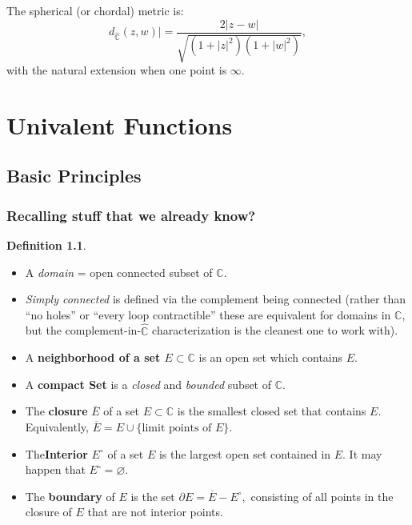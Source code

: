 \documentclass[
]{book}
\providecommand{\tightlist}{%
  \setlength{\itemsep}{0pt}\setlength{\parskip}{0pt}}
\theoremstyle{definition}
\newtheorem{definition}{Definition}[chapter]
\theoremstyle{definition}
\theoremstyle{definition}
\theoremstyle{definition}
\theoremstyle{remark}
\begin{document}
The spherical (or chordal) metric is:
\[
d_{\widehat{\mathbb{C}}}(z,w)|
= \frac{2|z-w|}{\sqrt{(1+|z|^2)(1+|w|^2)}},
\]
with the natural extension when one point is \(\infty\).

\chapter{Univalent Functions}\label{univalent-functions}

\section{Basic Principles}\label{basic-principles}

\subsection{Recalling stuff that we already know?}\label{recalling-stuff-that-we-already-know}

\begin{definition}
\protect\hypertarget{def:unnamed-chunk-19}{}\label{def:unnamed-chunk-19}\leavevmode

\begin{itemize}
\tightlist
\item
  A \emph{domain} = open connected subset of \(\mathbb{C}\).
\item
  \emph{Simply connected} is defined via the complement being connected (rather than ``no holes'' or ``every loop contractible'' these are equivalent for domains in \(\mathbb{C}\), but the complement-in-\(\hat{\mathbb{C}}\) characterization is the cleanest one to work with).
\item
  A \textbf{neighborhood of a set \(E \subset \mathbb{C}\)} is an open set which contains \(E\).
\item
  A \textbf{compact Set} is a \emph{closed} and \emph{bounded} subset of \(\mathbb{C}\).
\item
  The \textbf{closure} \(\overline{E}\) of a set \(E \subset \mathbb{C}\) is the smallest closed set that contains \(E\). Equivalently, \(\overline{E} = E \cup \{\text{limit points of } E\}.\)
\item
  The\textbf{Interior} \(E^\circ\) of a set \(E\) is the largest open set contained in \(E\). It may happen that \(E^\circ = \varnothing\).
\item
  The \textbf{boundary} of \(E\) is the set \(\partial E = \overline{E} - E^\circ,\) consisting of all points in the closure of \(E\) that are not interior points.
\end{itemize}

\end{definition}
\end{document}

